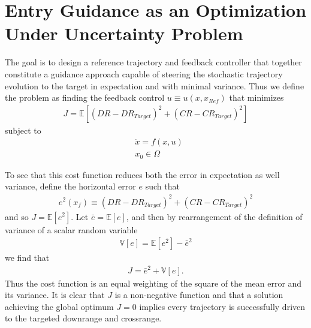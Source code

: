 \documentclass[10pt,a4paper]{article}
\begin{document}
	\section{Entry Guidance as an Optimization Under Uncertainty Problem}
	
	The goal is to design a reference trajectory and feedback controller that together constitute a guidance approach capable of steering the stochastic trajectory evolution to the target in expectation and with minimal variance. Thus we define the problem as finding the feedback control $u\equiv u(x,x_{Ref})$ that minimizes
	\begin{align}
		J = \mathbb{E}[(DR-DR_{Target})^2 + (CR-CR_{Target})^2]
	\end{align}
	subject to 
	\begin{align}
		&\dot{x} = f(x,u) \\
		&x_0 \in \Omega
	\end{align}
	
	To see that this cost function reduces both the error in expectation as well variance, define the horizontal error $e$ such that
		\begin{align}
		e^2(x_f) \equiv (DR-DR_{Target})^2 + (CR-CR_{Target})^2
		\end{align}
	and so $	J = \mathbb{E}[e^2]$. Let $\bar{e} = \mathbb{E}[e]$, and then by rearrangement of the definition of variance of a scalar random variable
		\begin{align}
		\mathbb{V}[e] = \mathbb{E}[e^2] - \bar{e}^2
		\end{align}
	we find that 
		\begin{align}
		J = \bar{e}^2 + \mathbb{V}[e].
		\end{align}
	Thus the cost function is an equal weighting of the square of the mean error and its variance. It is clear that $ J $ is a non-negative function and that a solution achieving the global optimum $ J=0 $ implies every trajectory is successfully driven to the targeted downrange and crossrange.
	
\end{document}
